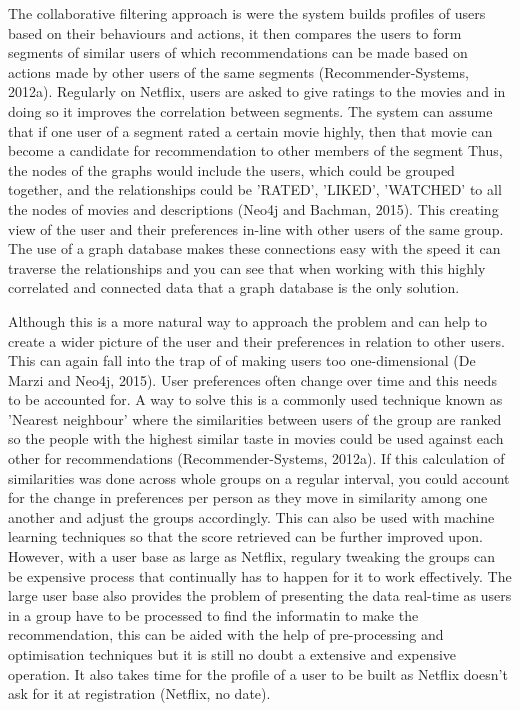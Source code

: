 \documentclass[a4paper]{article}
\begin{document}
The collaborative filtering approach is were the system builds profiles of users based on their behaviours and actions, it then compares the users to form segments of similar users of which recommendations can be made based on actions made by other users of the same segments (Recommender-Systems, 2012a). Regularly on Netflix, users are asked to give ratings to the movies and in doing so it improves the correlation between segments. The system can assume that if one user of a segment rated a certain movie highly, then that movie can become a candidate for recommendation to other members of the segment Thus, the nodes of the graphs would include the users, which could be grouped together, and the relationships could be 'RATED', 'LIKED', 'WATCHED' to all the nodes of movies and descriptions (Neo4j and Bachman, 2015). This creating view of the user and their preferences in-line with other users of the same group. The use of a graph database makes these connections easy with the speed it can traverse the relationships and you can see that when working with this highly correlated and connected data that a graph database is the only solution. \par

Although this is a more natural way to approach the problem and can help to create a wider picture of the user and their preferences in relation to other users. This can again fall into the trap of of making users too one-dimensional (De Marzi and Neo4j, 2015). User preferences often change over time and this needs to be accounted for. A way to solve this is a commonly used technique known as 'Nearest neighbour' where the similarities between users of the group are ranked so the people with the highest similar taste in movies could be used against each other for recommendations (Recommender-Systems, 2012a). If this calculation of similarities was done across whole groups on a regular interval, you could account for the change in preferences per person as they move in similarity among one another and adjust the groups accordingly. This can also be used with machine learning techniques so that the score retrieved can be further improved upon. However, with a user base as large as Netflix, regulary tweaking the groups can be expensive process that continually has to happen for it to work effectively. The large user base also provides the problem of presenting the data real-time as users in a group have to be processed to find the informatin to make the recommendation, this can be aided with the help of pre-processing and optimisation techniques but it is still no doubt a extensive and expensive operation. It also takes time for the profile of a user to be built as Netflix doesn't ask for it at registration (Netflix, no date).
\end{document}
